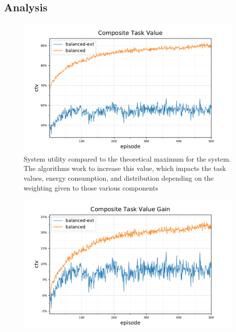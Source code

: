 \subsection{Analysis}
\begin{figure}[ht]
	\centering
	\includegraphics[width=0.7\linewidth]{5balanced_ctv-optimal-ctv}
	\captionsetup{labelfont=bf,singlelinecheck=on}
	\caption{System utility compared to the theoretical maximum for the \simulationSimple{}{} system. The algorithms work to increase this value, which impacts the task values, energy consumption, and distribution depending on the weighting given to those various components}
	\label{fig:5_ctv-optimal-ctv}
\end{figure}
\begin{figure}[ht]
	\centering
	\includegraphics[width=0.7\linewidth]{5balanced_ctv-optimal-ctv-gain}
	\captionsetup{labelfont=bf,singlelinecheck=on}
	\caption{}
	\label{fig:5_ctv-optimal-ctv-gain}
\end{figure}

